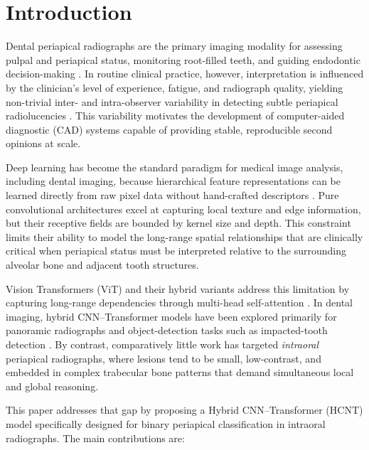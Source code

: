 \documentclass[conference]{IEEEtran}
\newcommand{\HCNT}{\textsc{HCNT}\xspace}
\begin{document}
\section{Introduction}
\label{sec:intro}

Dental periapical radiographs are the primary imaging modality for assessing
pulpal and periapical status, monitoring root-filled teeth, and guiding
endodontic decision-making \cite{pauwels2021}. In routine clinical practice,
however, interpretation is influenced by the clinician's level of experience,
fatigue, and radiograph quality, yielding non-trivial inter- and
intra-observer variability in detecting subtle periapical radiolucencies
\cite{pauwels2021,heo2021}. This variability motivates the development of
computer-aided diagnostic (CAD) systems capable of providing stable,
reproducible second opinions at scale.

Deep learning has become the standard paradigm for medical image analysis,
including dental imaging, because hierarchical feature representations can be
learned directly from raw pixel data without hand-crafted descriptors
\cite{bouali2024,ali2025,katsumata2023}. Pure convolutional architectures
excel at capturing local texture and edge information, but their receptive
fields are bounded by kernel size and depth. This constraint limits their
ability to model the long-range spatial relationships that are clinically
critical when periapical status must be interpreted relative to the surrounding
alveolar bone and adjacent tooth structures.

Vision Transformers (ViT) and their hybrid variants address this limitation by
capturing long-range dependencies through multi-head self-attention
\cite{dosovitskiy2021}. In dental imaging, hybrid CNN--Transformer models have
been explored primarily for panoramic radiographs and object-detection tasks
such as impacted-tooth detection \cite{kucuketal2025}. By contrast,
comparatively little work has targeted \emph{intraoral} periapical radiographs,
where lesions tend to be small, low-contrast, and embedded in complex
trabecular bone patterns that demand simultaneous local and global reasoning.

This paper addresses that gap by proposing a Hybrid CNN--Transformer (\HCNT)
model specifically designed for binary periapical classification in intraoral
radiographs. The main contributions are:
\end{document}
